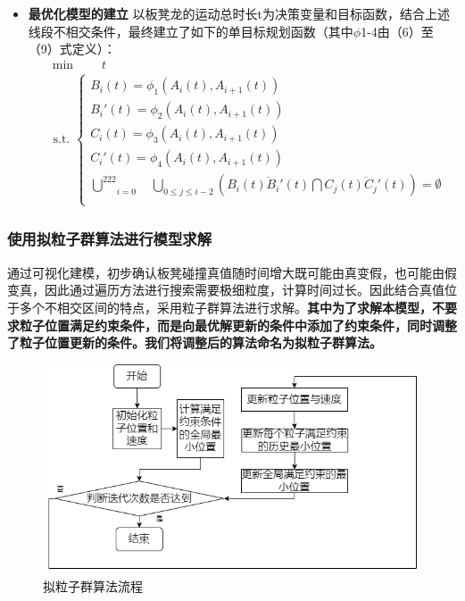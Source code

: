 \documentclass[a4paper]{article}
\begin{document}
\begin{itemize}
        \item {\textbf{最优化模型的建立}}
		以板凳龙的运动总时长t为决策变量和目标函数，结合上述线段不相交条件，最终建立了如下的单目标规划函数（其中$\phi$1-4由（6）至（9）式定义）：
		\begin{equation}
			\begin{aligned}
				& \min \quad \quad t \\
				& \text { s.t. }\left\{\begin{array}{l}
                        B_i(t) = \phi_1(A_i(t), A_{i + 1}(t))\\
                        B_{i}'(t) = \phi_2(A_i(t), A_{i + 1}(t))\\
                        C_i(t) = \phi_3(A_i(t), A_{i + 1}(t))\\
                        C_{i}'(t) = \phi_4(A_i(t), A_{i + 1}(t))\\
               \underset{i=0}{\overset{222}{\bigcup}}\quad \underset{0\leq j \leq i - 2}{\bigcup}(\overline{B_i(t)B_{i}'(t)} \bigcap \overline{C_j(t)C_{j}'(t)}) = \emptyset

  \\

				\end{array}\right.
			\end{aligned}
		\end{equation}
    \end{itemize}
	\subsubsection{使用拟粒子群算法进行模型求解}
 通过可视化建模，初步确认板凳碰撞真值随时间增大既可能由真变假，也可能由假变真，因此通过遍历方法进行搜索需要极细粒度，计算时间过长。因此结合真值位于多个不相交区间的特点，采用粒子群算法进行求解。\textbf{其中为了求解本模型，不要求粒子位置满足约束条件，而是向最优解更新的条件中添加了约束条件，同时调整了粒子位置更新的条件。我们将调整后的算法命名为拟粒子群算法。}

\begin{figure}[H]
    \centering
    \includegraphics[width=0.8\linewidth]{image/prcess_2.png}
    \caption{拟粒子群算法流程}
    \label{fig:enter-label3}
\end{figure}
\end{document}
